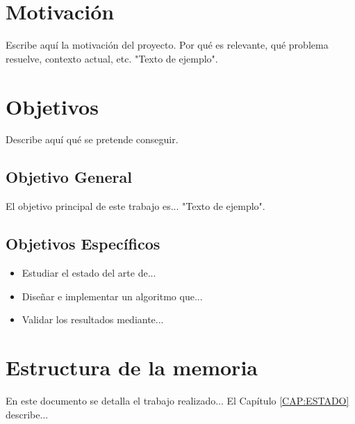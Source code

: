 \section{Motivación}
Escribe aquí la motivación del proyecto. Por qué es relevante, qué problema resuelve, contexto actual, etc. "Texto de ejemplo".

\section{Objetivos}
Describe aquí qué se pretende conseguir.

\subsection{Objetivo General}
El objetivo principal de este trabajo es... "Texto de ejemplo".

\subsection{Objetivos Específicos}
\begin{itemize}
    \item Estudiar el estado del arte de...
    \item Diseñar e implementar un algoritmo que...
    \item Validar los resultados mediante...
\end{itemize}

\section{Estructura de la memoria}
En este documento se detalla el trabajo realizado... El Capítulo \ref{CAP:ESTADO} describe...